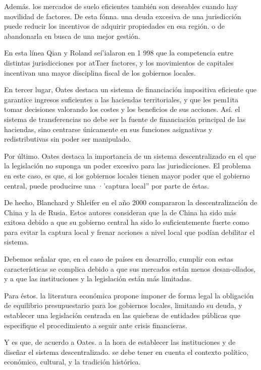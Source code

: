 \documentclass[10pt,a4paper]{article}
\begin{document}
Además. los mercados de suelo eficientes también son deseables cuando hay movilidad de factores. De esta fónna. una deuda excesiva de una jurisdicción puede reducir los incentivos de adquirir propiedades en esa región. o de abandonarla en busca de una mejor gestión.

En esta línea Qian y Roland seí'ialaron en 1 998 que la competencia entre distintas jurisdicciones por atTaer factores, y los movimientos de capitales incentivan una mayor disciplina fiscal de los gobiernos locales.

En tercer lugar, Oates destaca un sistema de financiación impositiva eficiente que garantice ingresos suficientes a las haciendas territoriales, y que les pem1ita tomar decisiones valorando los costes y los beneficios de sus acciones. Así. el sistema de transferencias no debe ser la fuente de financiación principal de las haciendas, sino centrarse únicamente en sus funciones asignativas y redistributivas sin poder ser manipulado. 

Por último. Oates destaca la importancia de un sistema descentralizado en el que la legislación no suponga un poder excesivo para las jurisdicciones. El problema en este caso, es que, si los gobiernos locales tienen mayor poder que el gobierno central, puede producirse una ·'captura local'' por parte de éstas.

De hecho, Blanchard y Shleifer en el año 2000 compararon la descentralización de China y la de Rusia. Estos autores consideran que la de China ha sido más exitosa debido a que su gobierno central ha sido lo suficientemente fuerte como para evitar la captura local y frenar acciones a nivel local que podían debilitar el sistema.

Debemos señalar que, en el caso de países en desarrollo, cumplir con estas características se complica debido a que sus mercados están menos desan-ollados, y a que las instituciones y la legislación están más limitadas.

Para éstos. la literatura económica propone imponer de forma legal la obligación de equilibrio presupuestario para los gobiernos locales, limitando su deuda, y establecer una legislación centrada en las quiebras de entidades públicas que especifique el procedimiento a seguir ante crisis financieras.

Y es que, de acuerdo a Oates. a la hora de establecer las instituciones y de diseñar el sistema descentralizado. se debe tener en cuenta el contexto político, económico, cultural, y la tradición histórica.
\end{document}
